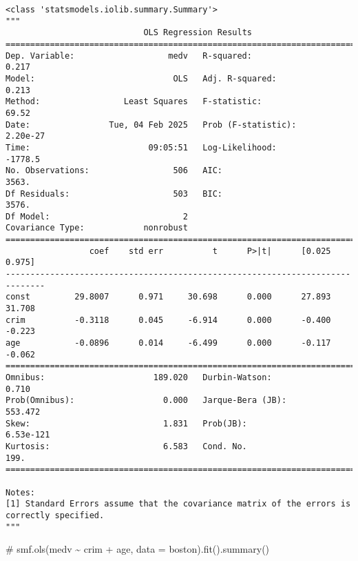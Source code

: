 \documentclass[
  letterpaper,
  DIV=11,
  numbers=noendperiod]{scrreprt}
\newenvironment{Shaded}{\begin{snugshade}}{\end{snugshade}}
\newcommand{\CommentTok}[1]{\textcolor[rgb]{0.37,0.37,0.37}{#1}}
\begin{document}
\begin{verbatim}
<class 'statsmodels.iolib.summary.Summary'>
"""
                            OLS Regression Results                            
==============================================================================
Dep. Variable:                   medv   R-squared:                       0.217
Model:                            OLS   Adj. R-squared:                  0.213
Method:                 Least Squares   F-statistic:                     69.52
Date:                Tue, 04 Feb 2025   Prob (F-statistic):           2.20e-27
Time:                        09:05:51   Log-Likelihood:                -1778.5
No. Observations:                 506   AIC:                             3563.
Df Residuals:                     503   BIC:                             3576.
Df Model:                           2                                         
Covariance Type:            nonrobust                                         
==============================================================================
                 coef    std err          t      P>|t|      [0.025      0.975]
------------------------------------------------------------------------------
const         29.8007      0.971     30.698      0.000      27.893      31.708
crim          -0.3118      0.045     -6.914      0.000      -0.400      -0.223
age           -0.0896      0.014     -6.499      0.000      -0.117      -0.062
==============================================================================
Omnibus:                      189.020   Durbin-Watson:                   0.710
Prob(Omnibus):                  0.000   Jarque-Bera (JB):              553.472
Skew:                           1.831   Prob(JB):                    6.53e-121
Kurtosis:                       6.583   Cond. No.                         199.
==============================================================================

Notes:
[1] Standard Errors assume that the covariance matrix of the errors is correctly specified.
"""
\end{verbatim}

\begin{Shaded}
\begin{Highlighting}[]

\CommentTok{\# smf.ols(\textquotesingle{}medv \textasciitilde{} crim + age\textquotesingle{}, data = boston).fit().summary()}
\end{Highlighting}
\end{Shaded}
\end{document}
